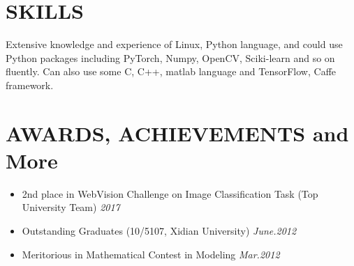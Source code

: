 \documentclass[11pt,a4paper,palatine]{moderncv}        %
\begin{document}
\begin{CJK*}{UTF8}{gbsn}
\section{SKILLS}
    Extensive knowledge and experience of Linux, Python language, and could use Python packages including PyTorch, Numpy, OpenCV, Sciki-learn and so on fluently. Can also use some C, C++, matlab language and TensorFlow, Caffe framework.

\section{AWARDS, ACHIEVEMENTS and More}
	\begin{itemize}
      \item 2nd place in WebVision Challenge on Image Classification Task (Top University Team) \hfill {\itshape 2017}
      \item Outstanding Graduates (10/5107, Xidian University) \hfill {\itshape June.2012}
      \item Meritorious in Mathematical Contest in Modeling \hfill {\itshape Mar.2012}
	\end{itemize}%

      

\nocite{*}



\end{CJK*}
\end{document}
